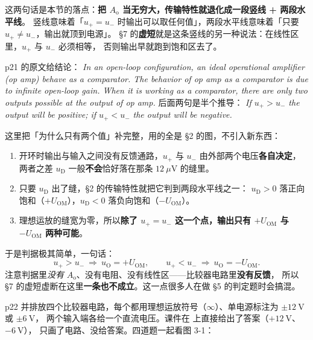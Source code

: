 \documentclass[11pt]{ctexart}
\begin{document}
这两句话是本节的落点：\textbf{把 $A_{\mathrm{o}}$ 当无穷大，传输特性就退化成一段竖线 + 两段水平线}。
竖线意味着「$u_+=u_-$ 时输出可以取任何值」，两段水平线意味着「只要 $u_+\neq u_-$，输出就顶到电源」。
§7 的\textbf{虚短}就是这条竖线的另一种说法：在线性区里，$u_+$ 与 $u_-$ 必须相等，
否则输出早就跑到饱和区去了。



p21 的原文给结论：
\textit{In an open-loop configuration, an ideal operational amplifier (op amp) behave as a comparator.
The behavior of op amp as a comparator is due to infinite open-loop gain. When it is working as a
comparator, there are only two outputs possible at the output of op amp.}
后面两句是半个推导：
\textit{If $u_+>u_-$ the output will be positive; if $u_+<u_-$ the output will be negative.}

这里把「为什么只有两个值」补完整，用的全是 §2 的图，不引入新东西：

\begin{enumerate}
\item 开环时输出与输入之间没有反馈通路，$u_+$ 与 $u_-$ 由外部两个电压\textbf{各自决定}，
两者之差 $u_{\mathrm{D}}$ 一般\textbf{不会}恰好落在那条 $12\ \mu\mathrm{V}$ 的缝里。
\item 只要 $u_{\mathrm{D}}$ 出了缝，§2 的传输特性就把它判到两段水平线之一：
$u_{\mathrm{D}}>0$ 落正向饱和（$+U_{\mathrm{OM}}$），$u_{\mathrm{D}}<0$ 落负向饱和（$-U_{\mathrm{OM}}$）。
\item 理想运放的缝宽为零，所以\textbf{除了 $u_+=u_-$ 这一个点，输出只有 $+U_{\mathrm{OM}}$ 与 $-U_{\mathrm{OM}}$ 两种可能}。
\end{enumerate}

于是判据极其简单，一句话：
\[
u_+>u_-\ \Longrightarrow\ u_{\mathrm{O}}=+U_{\mathrm{OM}},\qquad
u_+<u_-\ \Longrightarrow\ u_{\mathrm{O}}=-U_{\mathrm{OM}} .
\]
注意判据里\emph{没有} $A_{\mathrm{o}}$、没有电阻、没有线性区——比较器电路里\textbf{没有反馈}，
所以 §7 的虚短虚断在这里\textbf{一条也不成立}。这一点很多人在做 §5 的判定题时会搞混。


p22 并排放四个比较器电路，每个都用理想运放符号（$\infty$）、单电源标注为 $\pm12\ \mathrm{V}$ 或 $\pm6\ \mathrm{V}$，
两个输入端各给一个直流电压。课件在  上直接给出了答案（$+12\ \mathrm{V}$、$-6\ \mathrm{V}$），
 只画了电路、没给答案。四道题一起看图 3-1：
\end{document}
